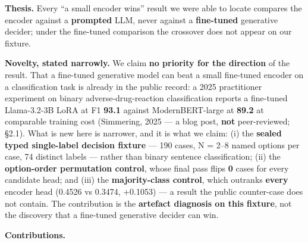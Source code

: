 \documentclass[11pt,a4paper]{article}
\begin{document}
\textbf{Thesis.} Every ``a small encoder wins'' result we were able to locate compares the encoder against a \textbf{prompted} LLM, never against a \textbf{fine-tuned} generative decider; under the fine-tuned comparison the crossover does not appear on our fixture.

\textbf{Novelty, stated narrowly.} We claim \textbf{no priority for the direction} of the result. That a fine-tuned generative model can beat a small fine-tuned encoder on a classification task is already in the public record: a 2025 practitioner experiment on binary adverse-drug-reaction classification reports a fine-tuned Llama-3.2-3B LoRA at F1 \textbf{93.1} against ModernBERT-large at \textbf{89.2} at comparable training cost (Simmering, 2025 --- a blog post, \textbf{not} peer-reviewed; \S2.1). What is new here is narrower, and it is what we claim: (i) the \textbf{sealed typed single-label decision fixture} --- 190 cases, N = 2--8 named options per case, 74 distinct labels --- rather than binary sentence classification; (ii) the \textbf{option-order permutation control}, whose final pass flips \textbf{0} cases for every candidate head; and (iii) the \textbf{majority-class control}, which outranks \textbf{every} encoder head (0.4526 vs 0.3474, +0.1053) --- a result the public counter-case does not contain. The contribution is the \textbf{artefact diagnosis on this fixture}, not the discovery that a fine-tuned generative decider can win.

\textbf{Contributions.}
\end{document}

